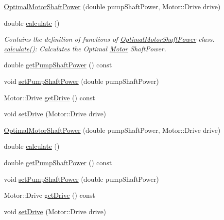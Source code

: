 \begin{DoxyCompactItemize}
\item 
\hyperlink{class_optimal_motor_shaft_power_af0981673204c5f8a8cae26a8be8a8a5c}{Optimal\+Motor\+Shaft\+Power} (double pump\+Shaft\+Power, Motor\+::\+Drive drive)
\item 
double \hyperlink{class_optimal_motor_shaft_power_a34d47733928ae518fa6f3d08b7d8a12e}{calculate} ()
\begin{DoxyCompactList}\small\item\em Contains the definition of functions of \hyperlink{class_optimal_motor_shaft_power}{Optimal\+Motor\+Shaft\+Power} class. \hyperlink{class_optimal_motor_shaft_power_a34d47733928ae518fa6f3d08b7d8a12e}{calculate()}\+: Calculates the Optimal \hyperlink{struct_motor}{Motor} Shaft\+Power. \end{DoxyCompactList}\item 
double \hyperlink{class_optimal_motor_shaft_power_aca7bb632c659ecf2ebf3cb9fdb23626f}{get\+Pump\+Shaft\+Power} () const
\item 
void \hyperlink{class_optimal_motor_shaft_power_ab2d80927fbaa62705359700b2a8f2f26}{set\+Pump\+Shaft\+Power} (double pump\+Shaft\+Power)
\item 
Motor\+::\+Drive \hyperlink{class_optimal_motor_shaft_power_a3cc369285d8b3582fcd8c44e5a1c37c8}{get\+Drive} () const
\item 
void \hyperlink{class_optimal_motor_shaft_power_a8f3288a69848c61f4e8e2b14da549d16}{set\+Drive} (Motor\+::\+Drive drive)
\item 
\hyperlink{class_optimal_motor_shaft_power_af0981673204c5f8a8cae26a8be8a8a5c}{Optimal\+Motor\+Shaft\+Power} (double pump\+Shaft\+Power, Motor\+::\+Drive drive)
\item 
double \hyperlink{class_optimal_motor_shaft_power_a34d47733928ae518fa6f3d08b7d8a12e}{calculate} ()
\item 
double \hyperlink{class_optimal_motor_shaft_power_aca7bb632c659ecf2ebf3cb9fdb23626f}{get\+Pump\+Shaft\+Power} () const
\item 
void \hyperlink{class_optimal_motor_shaft_power_ab2d80927fbaa62705359700b2a8f2f26}{set\+Pump\+Shaft\+Power} (double pump\+Shaft\+Power)
\item 
Motor\+::\+Drive \hyperlink{class_optimal_motor_shaft_power_a3cc369285d8b3582fcd8c44e5a1c37c8}{get\+Drive} () const
\item 
void \hyperlink{class_optimal_motor_shaft_power_a8f3288a69848c61f4e8e2b14da549d16}{set\+Drive} (Motor\+::\+Drive drive)
\item 

\end{DoxyCompactItemize}
